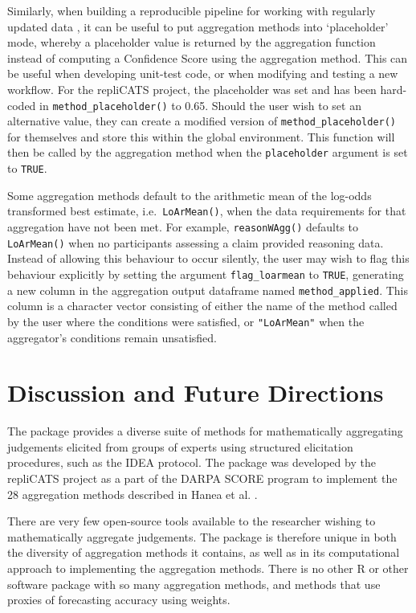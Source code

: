 \documentclass[article]{jss}
\begin{document}
Similarly, when building a reproducible pipeline for working with
regularly updated data \citep[e.g.][]{Yenni2019}, it can be useful to
put aggregation methods into `placeholder' mode, whereby a placeholder
value is returned by the aggregation function instead of computing a
Confidence Score using the aggregation method. This can be useful when
developing unit-test code, or when modifying and testing a new workflow.
For the repliCATS project, the placeholder was set and has been
hard-coded in \texttt{method\_placeholder()} to 0.65. Should the user
wish to set an alternative value, they can create a modified version of
\texttt{method\_placeholder()} for themselves and store this within the
global environment. This function will then be called by the aggregation
method when the \texttt{placeholder} argument is set to \texttt{TRUE}.

Some aggregation methods default to the arithmetic mean of the log-odds
transformed best estimate, i.e.~\texttt{LoArMean()}, when the data
requirements for that aggregation have not been met. For example,
\texttt{reasonWAgg()} defaults to \texttt{LoArMean()} when no
participants assessing a claim provided reasoning data. Instead of
allowing this behaviour to occur silently, the user may wish to flag
this behaviour explicitly by setting the argument
\texttt{flag\_loarmean} to \texttt{TRUE}, generating a new column in the
aggregation output dataframe named \texttt{method\_applied}. This column
is a character vector consisting of either the name of the method called
by the user where the conditions were satisfied, or \texttt{"LoArMean"}
when the aggregator's conditions remain unsatisfied.

\hypertarget{discussion-and-future-directions}{%
\section{Discussion and Future
Directions}\label{discussion-and-future-directions}}

The  package provides a diverse suite of methods for
mathematically aggregating judgements elicited from groups of experts
using structured elicitation procedures, such as the IDEA protocol. The
 package was developed by the repliCATS project as a part
of the DARPA SCORE program to implement the 28 aggregation methods
described in Hanea et al. \citeyearpar{Hanea2021}.

There are very few open-source tools available to the researcher wishing
to mathematically aggregate judgements. The  package is
therefore unique in both the diversity of aggregation methods it
contains, as well as in its computational approach to implementing the
aggregation methods. There is no other R or other software package with
so many aggregation methods, and methods that use proxies of forecasting
accuracy using weights.
\end{document}
